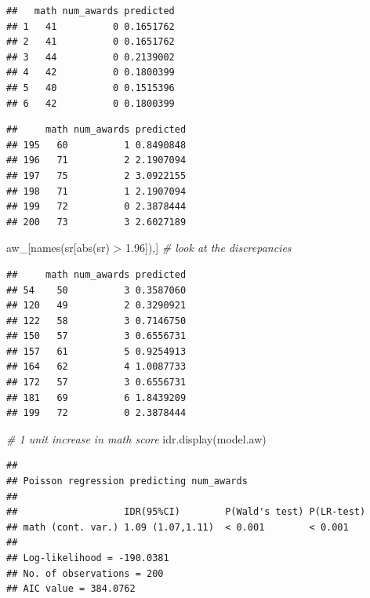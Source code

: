 \documentclass[
]{book}
\makeatletter
\newenvironment{Shaded}{\begin{snugshade}}{\end{snugshade}}
\newcommand{\CommentTok}[1]{\textcolor[rgb]{0.37,0.37,0.37}{\textit{#1}}}
\newcommand{\FloatTok}[1]{\textcolor[rgb]{0.06,0.06,0.06}{#1}}
\newcommand{\FunctionTok}[1]{\textcolor[rgb]{0,0,0}{#1}}
\newcommand{\NormalTok}[1]{#1}
\newcommand{\SpecialCharTok}[1]{\textcolor[rgb]{0,0,0}{#1}}
\newenvironment{kframe}{%
\medskip{}
\setlength{\fboxsep}{.8em}
 \def\at@end@of@kframe{}%
 \ifinner\ifhmode%
  \def\at@end@of@kframe{\end{minipage}}%
  \begin{minipage}{\columnwidth}%
 \fi\fi%
 \def\FrameCommand##1{\hskip\@totalleftmargin \hskip-\fboxsep
 \colorbox{shadecolor}{##1}\hskip-\fboxsep
     \hskip-\linewidth \hskip-\@totalleftmargin \hskip\columnwidth}%
 \MakeFramed {\advance\hsize-\width
   \@totalleftmargin\z@ \linewidth\hsize
   \@setminipage}}%
 {\par\unskip\endMakeFramed%
 \at@end@of@kframe}
\renewenvironment{Shaded}{\begin{kframe}}{\end{kframe}}
\makeatother
\begin{document}
\begin{verbatim}
##   math num_awards predicted
## 1   41          0 0.1651762
## 2   41          0 0.1651762
## 3   44          0 0.2139002
## 4   42          0 0.1800399
## 5   40          0 0.1515396
## 6   42          0 0.1800399
\end{verbatim}

\begin{verbatim}
##     math num_awards predicted
## 195   60          1 0.8490848
## 196   71          2 2.1907094
## 197   75          2 3.0922155
## 198   71          1 2.1907094
## 199   72          0 2.3878444
## 200   73          3 2.6027189
\end{verbatim}

\begin{Shaded}
\begin{Highlighting}[]
\NormalTok{aw\_[}\FunctionTok{names}\NormalTok{(sr[}\FunctionTok{abs}\NormalTok{(sr) }\SpecialCharTok{\textgreater{}} \FloatTok{1.96}\NormalTok{]),] }\CommentTok{\# look at the discrepancies}
\end{Highlighting}
\end{Shaded}

\begin{verbatim}
##     math num_awards predicted
## 54    50          3 0.3587060
## 120   49          2 0.3290921
## 122   58          3 0.7146750
## 150   57          3 0.6556731
## 157   61          5 0.9254913
## 164   62          4 1.0087733
## 172   57          3 0.6556731
## 181   69          6 1.8439209
## 199   72          0 2.3878444
\end{verbatim}

\begin{Shaded}
\begin{Highlighting}[]
\CommentTok{\# 1 unit increase in math score}
\FunctionTok{idr.display}\NormalTok{(model.aw)}
\end{Highlighting}
\end{Shaded}

\begin{verbatim}
## 
## Poisson regression predicting num_awards 
##  
##                   IDR(95%CI)        P(Wald's test) P(LR-test)
## math (cont. var.) 1.09 (1.07,1.11)  < 0.001        < 0.001   
##                                                              
## Log-likelihood = -190.0381
## No. of observations = 200
## AIC value = 384.0762
\end{verbatim}
\end{document}
